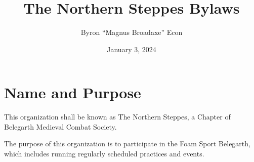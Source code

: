 \documentclass[12pt]{article}
\title{The Northern Steppes Bylaws}
\author{Byron ``Magnus Broadaxe'' Econ}
\date{January 3, 2024}
\begin{document}
\maketitle

\section{Name and Purpose}
\begin{level}
\item This organization shall be known as The Northern Steppes, a Chapter of Belegarth Medieval Combat Society.
\item The purpose of this organization is to participate in the Foam Sport Belegarth, which includes running regularly scheduled practices and events.
\end{level}
\end{document}
